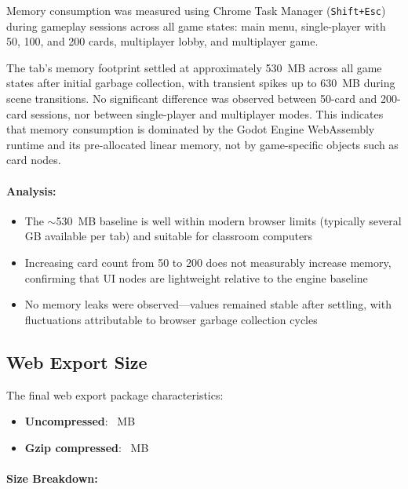 Memory consumption was measured using Chrome Task Manager (\texttt{Shift+Esc}) during gameplay sessions across all game states: main menu, single-player with 50, 100, and 200 cards, multiplayer lobby, and multiplayer game.

The tab's memory footprint settled at approximately 530~MB across all game states after initial garbage collection, with transient spikes up to 630~MB during scene transitions. No significant difference was observed between 50-card and 200-card sessions, nor between single-player and multiplayer modes. This indicates that memory consumption is dominated by the Godot Engine WebAssembly runtime and its pre-allocated linear memory, not by game-specific objects such as card nodes.

\paragraph*{Analysis:}

\begin{itemize}
    \item The $\sim$530~MB baseline is well within modern browser limits (typically several GB available per tab) and suitable for classroom computers
    \item Increasing card count from 50 to 200 does not measurably increase memory, confirming that UI nodes are lightweight relative to the engine baseline
    \item No memory leaks were observed---values remained stable after settling, with fluctuations attributable to browser garbage collection cycles
\end{itemize}

\subsection{Web Export Size}
\label{subsec:export-size}

The final web export package characteristics:

\begin{itemize}
    \item \textbf{Uncompressed}: \exportSizeUncompressed~MB
    \item \textbf{Gzip compressed}: \exportSizeGzip~MB
\end{itemize}

\paragraph*{Size Breakdown:}


